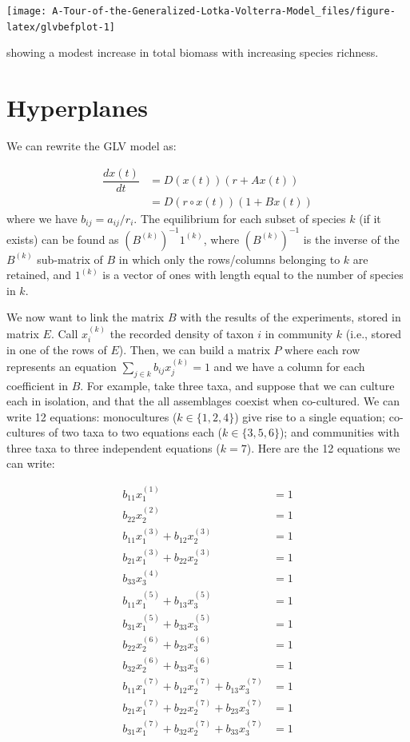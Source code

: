 \documentclass[
]{book}
\begin{document}
\begin{center}\texttt{[image: A-Tour-of-the-Generalized-Lotka-Volterra-Model\_files/figure-latex/glvbefplot-1]} \end{center}

showing a modest increase in total biomass with increasing species richness.

\hypertarget{hyperplanes}{%
\section{Hyperplanes}\label{hyperplanes}}

We can rewrite the GLV model as:

\[
\begin{aligned}
\dfrac{dx(t)}{dt} &= D(x(t))(r + A x(t))\\
&= D(r \circ x(t))(1 + B x(t))
\end{aligned}
\]
where we have \(b_{ij} = a_{ij} / r_i\). The equilibrium for each subset of species \(k\) (if it exists) can be found as \((B^{(k)})^{-1} 1^{(k)}\), where \((B^{(k)})^{-1}\) is the inverse of the \(B^{(k)}\) sub-matrix of \(B\) in which only the rows/columns belonging to \(k\) are retained, and \(1^{(k)}\) is a vector of ones with length equal to the number of species in \(k\).

We now want to link the matrix \(B\) with the results of the experiments, stored in matrix \(E\). Call \(x^{(k)}_i\) the recorded density of taxon \(i\) in community \(k\) (i.e., stored in one of the rows of \(E\)). Then, we can build a matrix \(P\) where each row represents an equation \(\sum_{j \in k} b_{ij} x_j^{(k)} = 1\) and we have a column for each coefficient in \(B\). For example, take three taxa, and suppose that we can culture each in isolation, and that the all assemblages coexist when co-cultured. We can write 12 equations: monocultures (\(k \in \{1, 2, 4\}\)) give rise to a single equation; co-cultures of two taxa to two equations each (\(k \in \{3, 5, 6 \}\)); and communities with three taxa to three independent equations (\(k = 7\)). Here are the 12 equations we can write:

\[
\begin{aligned}
b_{11} x_1^{(1)} &= 1\\
b_{22} x_2^{(2)} &= 1\\
b_{11} x_1^{(3)} + b_{12}x_2^{(3)} &= 1\\
b_{21} x_1^{(3)} + b_{22}x_2^{(3)} &= 1\\
b_{33} x_3^{(4)} &= 1\\
b_{11} x_1^{(5)} + b_{13} x_3^{(5)} &= 1\\
b_{31} x_1^{(5)} + b_{33} x_3^{(5)} &= 1\\
b_{22} x_2^{(6)} + b_{23} x_3^{(6)} &= 1\\
b_{32} x_2^{(6)} + b_{33} x_3^{(6)} &= 1\\
b_{11} x_1^{(7)} + b_{12} x_2^{(7)} + b_{13} x_3^{(7)} & = 1\\
b_{21} x_1^{(7)} + b_{22} x_2^{(7)} + b_{23} x_3^{(7)} & = 1\\
b_{31} x_1^{(7)} + b_{32} x_2^{(7)} + b_{33} x_3^{(7)} & = 1
\end{aligned}
\]
\end{document}
